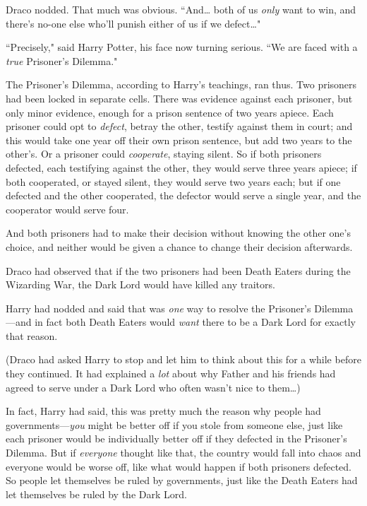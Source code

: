 Draco nodded. That much was obvious. ``And{\ldots} both of us \emph{only} want to win, and there's no-one else who'll punish either of us if we defect{\ldots}"

``Precisely," said Harry Potter, his face now turning serious. ``We are faced with a \emph{true} Prisoner's Dilemma."

The Prisoner's Dilemma, according to Harry's teachings, ran thus. Two prisoners had been locked in separate cells. There was evidence against each prisoner, but only minor evidence, enough for a prison sentence of two years apiece. Each prisoner could opt to \emph{defect}, betray the other, testify against them in court; and this would take one year off their own prison sentence, but add two years to the other's. Or a prisoner could \emph{cooperate}, staying silent. So if both prisoners defected, each testifying against the other, they would serve three years apiece; if both cooperated, or stayed silent, they would serve two years each; but if one defected and the other cooperated, the defector would serve a single year, and the cooperator would serve four.

And both prisoners had to make their decision without knowing the other one's choice, and neither would be given a chance to change their decision afterwards.

Draco had observed that if the two prisoners had been Death Eaters during the Wizarding War, the Dark Lord would have killed any traitors.

Harry had nodded and said that was \emph{one} way to resolve the Prisoner's Dilemma—and in fact both Death Eaters would \emph{want} there to be a Dark Lord for exactly that reason.

(Draco had asked Harry to stop and let him to think about this for a while before they continued. It had explained a \emph{lot} about why Father and his friends had agreed to serve under a Dark Lord who often wasn't nice to them{\ldots})

In fact, Harry had said, this was pretty much the reason why people had governments—\emph{you} might be better off if you stole from someone else, just like each prisoner would be individually better off if they defected in the Prisoner's Dilemma. But if \emph{everyone} thought like that, the country would fall into chaos and everyone would be worse off, like what would happen if both prisoners defected. So people let themselves be ruled by governments, just like the Death Eaters had let themselves be ruled by the Dark Lord.

